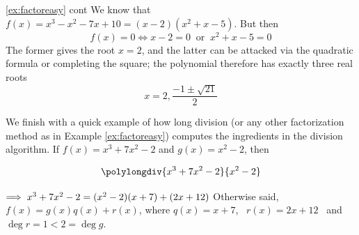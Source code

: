 

\begin{example*}{\ref{ex:factoreasy} cont}{}
	We know that $f(x)=x^3-x^2-7x+10=(x-2)(x^2+x-5)$. But then
	\[
		f(x)=0\iff x-2=0\ \text{ or }\ x^2+x-5=0
	\]
	The former gives the root $x=2$, and the latter can be attacked via the quadratic formula or completing the square; the polynomial therefore has exactly three real roots
	\[
		x=2,\frac{-1\pm\sqrt{21}}2
	\] 
\end{example*}


\begin{example}{}{}
	We finish with a quick example of how long division (or any other factorization method as in Example \ref{ex:factoreasy}) computes the ingredients in the division algorithm.\smallbreak
	If $f(x)=x^3+7x^2-2$ and $g(x)=x^2-2$, then\par
	\begin{minipage}[t]{0.35\linewidth}\vspace{-13pt}
		\[
			\polylongdiv{x^3+7x^2-2}{x^2-2}
		\]
	\end{minipage}
	\hfill
	\begin{minipage}[t]{0.6\linewidth}\vspace{10pt}
		$\negthickspace\implies x^3+7x^2-2=(x^2-2)(x+7)+(2x+12)$\medbreak
		Otherwise said, $f(x)=g(x)q(x)+r(x)$, where\medbreak
		$q(x)=x+7$, \ $r(x)=2x+12$ \ and \ $\deg r=1<2=\deg g$.
	\end{minipage}
\end{example}

\goodbreak



